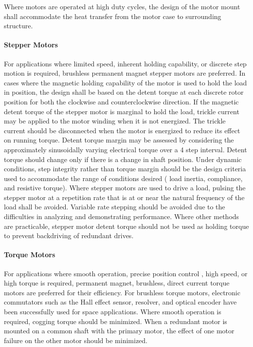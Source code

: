 \documentclass[12pt]{article}
\begin{document}
Where motors are operated at high duty cycles, the design of the motor mount shall accommodate the heat transfer from the motor case to surrounding structure.

\paragraph{Stepper Motors} %
For applications where limited speed, inherent holding capability, or discrete step motion is required, brushless permanent magnet stepper motors are preferred. 
In cases where the magnetic holding capability of the motor is used to hold the load in position, the design shall be based on the detent torque at each discrete rotor position for both the clockwise and counterclockwise direction. 
If the magnetic detent torque of the stepper motor is marginal to hold the load, trickle current may be applied to the motor winding when it is not energized. 
The trickle current should be disconnected when the motor is energized to reduce its effect on running torque. 
Detent torque margin may be assessed by considering the approximately sinusoidally varying electrical torque over a 4 step interval. 
Detent torque should change only if there is a change in shaft position.
Under dynamic conditions, step integrity rather than torque margin should be the design criteria used to accommodate the range of conditions desired ( load inertia, compliance, and resistive torque). 
Where stepper motors are used to drive a load, pulsing the stepper motor at a repetition rate that is at or near the natural frequency of the load shall be avoided. 
Variable rate stepping should be avoided due to the difficulties in analyzing and demonstrating performance. 
Where other methods are practicable, stepper motor detent torque should not be used as holding torque to prevent backdriving of redundant drives.

\paragraph{Torque Motors} %
For applications where smooth operation, precise position control , high speed, or high torque is required, permanent magnet, brushless, direct current torque motors are preferred for their efficiency. 
For brushless torque motors, electronic commutators such as the Hall effect sensor, resolver, and optical encoder have been successfully used for space applications. 
Where smooth operation is required, cogging torque should be minimized. 
When a redundant motor is mounted on a common shaft with the primary motor, the effect of one motor failure on the other motor should be minimized.
\end{document}

